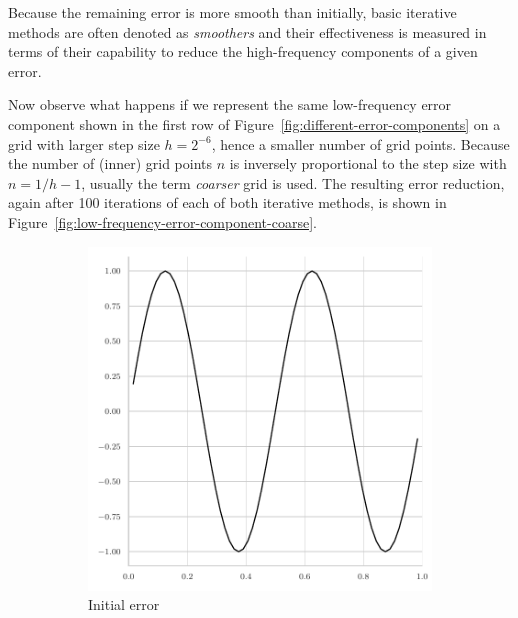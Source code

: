 Because the remaining error is more smooth than initially, basic iterative methods are often denoted as \emph{smoothers} and their effectiveness is measured in terms of their capability to reduce the high-frequency components of a given error. 

Now observe what happens if we represent the same low-frequency error component shown in the first row of Figure~\ref{fig:different-error-components} on a grid with larger step size $h = 2^{-6}$, hence a smaller number of grid points.
Because the number of (inner) grid points $n$ is inversely proportional to the step size with $n = 1/h - 1$, usually the term \emph{coarser} grid is used.
The resulting error reduction, again after 100 iterations of each of both iterative methods, is shown in Figure~\ref{fig:low-frequency-error-component-coarse}. 
\begin{figure}
	\begin{subfigure}[b]{0.32\textwidth}
	\centering
	\includegraphics[width=\textwidth]{figures/initial_error_jacobi_4pi_coarse.pdf}
	\caption{Initial error}
\end{subfigure}
\hfill
\begin{subfigure}[b]{0.32\textwidth}
	\centering

\end{subfigure}
\end{figure}
